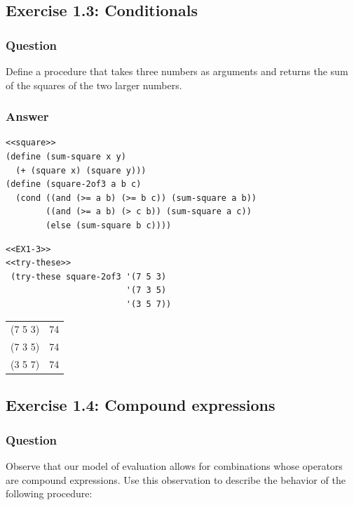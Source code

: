\documentclass[final,fleqn,titlepage,twoside]{article}
\begin{document}
\subsection{Exercise 1.3: Conditionals}
\label{sec:orgb5bf3d9}
\subsubsection{Question}
\label{sec:org309078b}
Define a procedure that takes three numbers as arguments and
returns the sum of the squares of the two larger numbers.

\subsubsection{Answer}
\label{sec:org711472c}
\begin{verbatim}
<<square>>
(define (sum-square x y)
  (+ (square x) (square y)))
(define (square-2of3 a b c)
  (cond ((and (>= a b) (>= b c)) (sum-square a b))
        ((and (>= a b) (> c b)) (sum-square a c))
        (else (sum-square b c))))
\end{verbatim}
\begin{verbatim}
<<EX1-3>>
<<try-these>>
 (try-these square-2of3 '(7 5 3)
                        '(7 3 5)
                        '(3 5 7))
\end{verbatim}

\begin{center}
\begin{tabular}{lr}
(7 5 3) & 74\\[0pt]
(7 3 5) & 74\\[0pt]
(3 5 7) & 74\\[0pt]
\end{tabular}
\end{center}

\subsection{Exercise 1.4: Compound expressions}
\label{sec:orgbb5eeef}
\subsubsection{Question}
\label{sec:org58e6b43}
Observe that our model of evaluation allows for combinations whose operators are
compound expressions. Use this observation to describe the behavior of the
following procedure:
\end{document}
